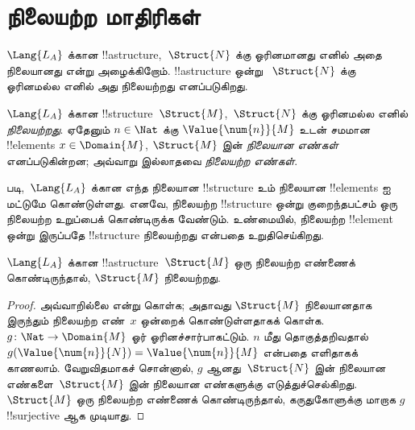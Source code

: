 \documentclass[../../../include/open-logic-section]{subfiles}
\begin{document}

\section{நிலையற்ற மாதிரிகள்}

\begin{explain}
$\Lang{L_A}$ க்கான !!a{structure},~$\Struct{N}$ க்கு ஓரினமானது
எனில் அதை நிலையானது என்று அழைக்கிறோம். !!a{structure} ஒன்று
~$\Struct{N}$ க்கு ஓரினமல்ல எனில் அது நிலையற்றது எனப்படுகிறது.
\end{explain}

\begin{defn}
$\Lang{L_A}$ க்கான !!{structure}~$\Struct{M}$,~$\Struct{N}$ க்கு
ஓரினமல்ல எனில் \emph{நிலையற்றது}. ஏதேனும் $n \in
\Nat$ க்கு $\Value{\num{n}}{M}$ உடன் சமமான !!{element}s
$x \in \Domain{M}$, $\Struct{M}$ இன் \emph{நிலையான எண்கள்}
எனப்படுகின்றன; அவ்வாறு இல்லாதவை \emph{நிலையற்ற எண்கள்}.
\end{defn}

\begin{explain}
 படி,~$\Lang{L_A}$ க்கான எந்த
நிலையான !!{structure} உம் நிலையான !!{element}s ஐ மட்டுமே கொண்டுள்ளது.
எனவே, நிலையற்ற !!{structure} ஒன்று குறைந்தபட்சம் ஒரு நிலையற்ற
உறுப்பைக் கொண்டிருக்க வேண்டும். உண்மையில், நிலையற்ற !!{element}
ஒன்று இருப்பதே !!{structure} நிலையற்றது என்பதை உறுதிசெய்கிறது.
\end{explain}

\begin{prop}
$\Lang{L_A}$ க்கான !!a{structure}~$\Struct{M}$ ஒரு நிலையற்ற எண்ணைக்
கொண்டிருந்தால், $\Struct{M}$ நிலையற்றது.
\end{prop}

\begin{proof}
அவ்வாறில்லை என்று கொள்க; அதாவது $\Struct{M}$ நிலையானதாக இருந்தும்
நிலையற்ற எண்~$x$ ஒன்றைக் கொண்டுள்ளதாகக் கொள்க.
$g\colon \Nat \to \Domain{M}$ ஓர் ஓரினச்சார்பாகட்டும். $n$ மீது
தொகுத்தறிவதால் $g(\Value{\num{n}}{N}) =
\Value{\num{n}}{M}$ என்பதை எளிதாகக் காணலாம். வேறுவிதமாகச் சொன்னால்,
$g$ ஆனது~$\Struct{N}$ இன் நிலையான எண்களை~$\Struct{M}$ இன் நிலையான
எண்களுக்கு எடுத்துச்செல்கிறது. $\Struct{M}$ ஒரு நிலையற்ற எண்ணைக்
கொண்டிருந்தால், கருதுகோளுக்கு மாறாக $g$ !!{surjective} ஆக முடியாது.
\end{proof}
\end{document}
